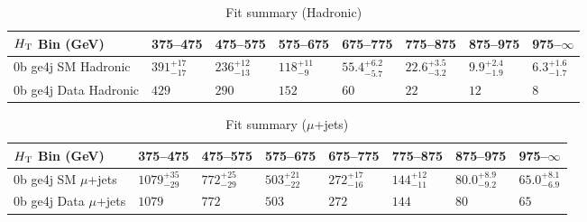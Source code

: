 \documentclass[8pt]{article}
\def\scalht{\mbox{$H_{\rm{T}}$}\xspace}
\newcommand\T{\rule{0pt}{2.6ex}}
\begin{document}
\begin{table}[ht!]
\caption{Fit summary (Hadronic)}
\label{tab:ensemble-summary}
\centering
\begin{tabular}{ llllllll }

\hline
\scalht Bin (GeV)       & 375--475                       & 475--575                       & 575--675                       & 675--775                       & 775--875                       & 875--975                       & 975--$\infty$                  \\ [1.000000ex]
\hline
0b ge4j SM Hadronic\T   & $391^{+17}_{-17}$              & $236^{+12}_{-13}$              & $118^{+11}_{-9}$               & $55.4^{+6.2}_{-5.7}$           & $22.6^{+3.5}_{-3.2}$           & $9.9^{+2.4}_{-1.9}$            & $6.3^{+1.6}_{-1.7}$            \\ 
0b ge4j Data Hadronic\T & $429$                          & $290$                          & $152$                          & $60$                           & $22$                           & $12$                           & $8$                            \\ 
\hline

\end{tabular}
\end{table}
\begin{table}[ht!]
\caption{Fit summary ($\mu$+jets)}
\label{tab:ensemble-summary}
\centering
\begin{tabular}{ llllllll }

\hline
\scalht Bin (GeV)       & 375--475                       & 475--575                       & 575--675                       & 675--775                       & 775--875                       & 875--975                       & 975--$\infty$                  \\ [1.000000ex]
\hline
0b ge4j SM $\mu$+jets\T & $1079^{+35}_{-29}$             & $772^{+25}_{-29}$              & $503^{+21}_{-22}$              & $272^{+17}_{-16}$              & $144^{+12}_{-11}$              & $80.0^{+8.9}_{-9.2}$           & $65.0^{+8.1}_{-6.9}$           \\ 
0b ge4j Data $\mu$+jets\T & $1079$                         & $772$                          & $503$                          & $272$                          & $144$                          & $80$                           & $65$                           \\ 
\hline

\end{tabular}
\end{table}
\end{document}
